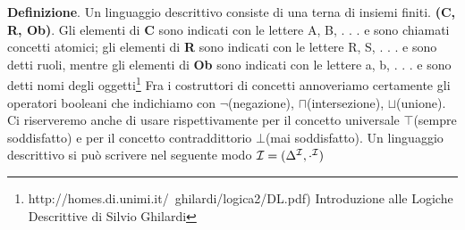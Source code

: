 \documentclass[a4paper,11pt]{article}
\newcommand{\I}{%
        \ensuremath{\mathcal{I}}\xspace}
\begin{document}
\begin{enumerate}
\begin{enumerate}[label*=\arabic*.]
\textbf{Definizione}. \newline Un linguaggio descrittivo consiste di una terna di insiemi finiti. \textbf{(C, R, Ob)}. Gli elementi di \textbf{C} sono indicati con le lettere A, B, . . . e sono chiamati concetti atomici; gli elementi di \textbf{R} sono indicati con le lettere R, S, . . . e sono detti
ruoli, mentre gli elementi di \textbf{Ob} sono indicati con le lettere a, b, . . . e sono detti nomi degli oggetti\footnote{ http://homes.di.unimi.it/~ghilardi/logica2/DL.pdf) Introduzione alle Logiche Descrittive di Silvio Ghilardi}\newline
Fra i costruttori di concetti annoveriamo certamente gli operatori booleani che indichiamo con $\neg$(negazione), $\sqcap$(intersezione), $\sqcup$(unione). Ci riserveremo anche di usare rispettivamente per il concetto universale $\top$(sempre soddisfatto) e  per il concetto contraddittorio $\bot$(mai soddisfatto).\newline
Un linguaggio descrittivo si può scrivere nel seguente modo $\I = (\Delta^\I,\cdot^\I)$


\end{enumerate}
\end{enumerate}
\end{document}

